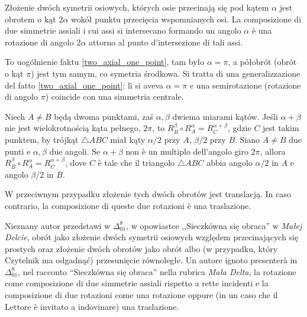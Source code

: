 \begin{proposition}
    Złożenie dwóch symetrii osiowych, których osie przecinają się pod kątem $\alpha$ jest obrotem o kąt $2 \alpha$ wokół punktu przecięcia wspomnianych osi. %
    La composizione di due simmetrie assiali i cui assi si intersecano formando un angolo $\alpha$ è una rotazione di angolo $2\alpha$ attorno al punto d'intersezione di tali assi. %
\end{proposition}

To uogólnienie faktu \ref{two_axial_one_point}, tam było $\alpha = \pi$, a półobrót (obrót o kąt $\pi$) jest tym samym, co symetria środkowa. %
Si tratta di una generalizzazione del fatto \ref{two_axial_one_point}: lì si aveva $\alpha = \pi$ e una semirotazione (rotazione di angolo $\pi$) coincide con una simmetria centrale. %

\begin{proposition}
\label{for_banach_11}%
    Niech $A \neq B$ będą dwoma punktami, zaś $\alpha, \beta$ dwiema miarami kątów. %
    Jeśli $\alpha + \beta$ nie jest wielokrotnością kąta pełnego, $2 \pi$, to $R_B^\beta \circ R_A^\alpha = R_C^{\alpha + \beta}$, gdzie $C$ jest takim punktem, by trójkąt $\triangle ABC$ miał kąty $\alpha/2$ przy $A$, $\beta / 2$ przy $B$. %
    Siano $A \neq B$ due punti e $\alpha, \beta$ due angoli. %
    Se $\alpha + \beta$ non è un multiplo dell'angolo giro $2\pi$, allora $R_B^\beta \circ R_A^\alpha = R_C^{\alpha + \beta}$, dove $C$ è tale che il triangolo $\triangle ABC$ abbia angolo $\alpha/2$ in $A$ e angolo $\beta/2$ in $B$. %

    W przeciwnym przypadku złożenie tych dwóch obrotów jest translacją. %
    In caso contrario, la composizione di queste due rotazioni è una traslazione. %
\end{proposition}

Nieznany autor przedstawi w $\Delta_{01}^{8}$, w opowiastce ,,Sieczkówna się obraca'' w \emph{Małej Delcie}, obrót jako złożenie dwóch symetrii osiowych względem przecinających się prostych oraz złożenie dwóch obrotów jako obrót albo (w przypadku, który Czytelnik ma odgadnąć) przesunięcie równoległe. %
Un autore ignoto presenterà in $\Delta_{01}^{8}$, nel racconto ``Sieczkówna się obraca'' nella rubrica \emph{Mała Delta}, la rotazione come composizione di due simmetrie assiali rispetto a rette incidenti e la composizione di due rotazioni come una rotazione oppure (in un caso che il Lettore è invitato a indovinare) una traslazione. %

%